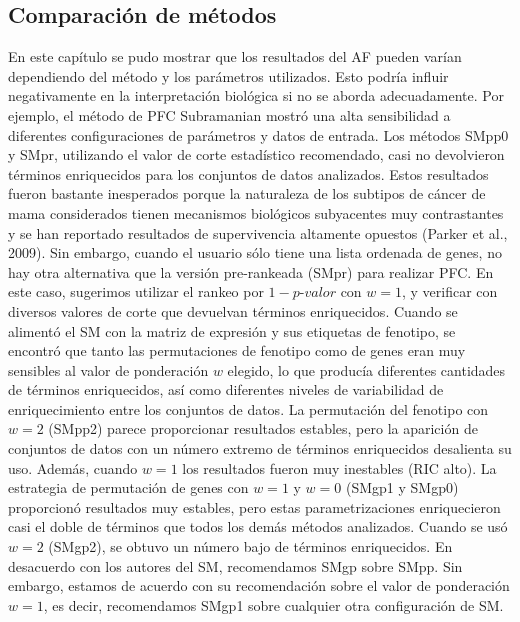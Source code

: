 \documentclass[12pt,twoside]{reedthesis}
\begin{document}
\hypertarget{comparaciuxf3n-de-muxe9todos}{%
\subsection{Comparación de métodos}\label{comparaciuxf3n-de-muxe9todos}}

\par

En este capítulo se pudo mostrar que los resultados del AF pueden varían dependiendo del método y los parámetros utilizados. Esto podría influir negativamente en la interpretación biológica si no se aborda adecuadamente. Por ejemplo, el método de PFC Subramanian mostró una alta sensibilidad a diferentes configuraciones de parámetros y datos de entrada. Los métodos SMpp0 y SMpr, utilizando el valor de corte estadístico recomendado, casi no devolvieron términos enriquecidos para los conjuntos de datos analizados. Estos resultados fueron bastante inesperados porque la naturaleza de los subtipos de cáncer de mama considerados tienen mecanismos biológicos subyacentes muy contrastantes y se han reportado resultados de supervivencia altamente opuestos (Parker et al., 2009). Sin embargo, cuando el usuario sólo tiene una lista ordenada de genes, no hay otra alternativa que la versión pre-rankeada (SMpr) para realizar PFC. En este caso, sugerimos utilizar el rankeo por \(1-p\)-\(valor\) con \(w=1\), y verificar con diversos valores de corte que devuelvan términos enriquecidos. Cuando se alimentó el SM con la matriz de expresión y sus etiquetas de fenotipo, se encontró que tanto las permutaciones de fenotipo como de genes eran muy sensibles al valor de ponderación \(w\) elegido, lo que producía diferentes cantidades de términos enriquecidos, así como diferentes niveles de variabilidad de enriquecimiento entre los conjuntos de datos. La permutación del fenotipo con \(w=2\) (SMpp2) parece proporcionar resultados estables, pero la aparición de conjuntos de datos con un número extremo de términos enriquecidos desalienta su uso. Además, cuando \(w=1\) los resultados fueron muy inestables (RIC alto). La estrategia de permutación de genes con \(w=1\) y \(w=0\) (SMgp1 y SMgp0) proporcionó resultados muy estables, pero estas parametrizaciones enriquecieron casi el doble de términos que todos los demás métodos analizados. Cuando se usó \(w=2\) (SMgp2), se obtuvo un número bajo de términos enriquecidos. En desacuerdo con los autores del SM, recomendamos SMgp sobre SMpp. Sin embargo, estamos de acuerdo con su recomendación sobre el valor de ponderación \(w=1\), es decir, recomendamos SMgp1 sobre cualquier otra configuración de SM.
\end{document}
